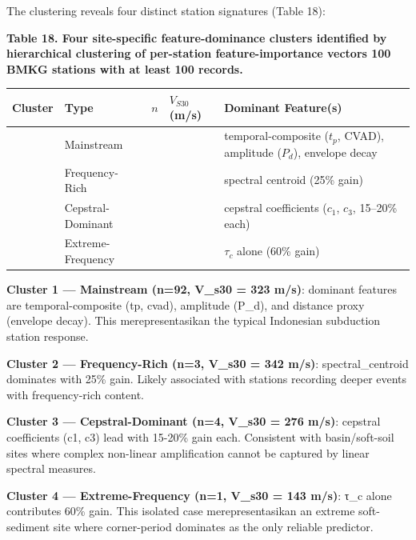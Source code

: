 \documentclass[10pt]{article}
\begin{document}
The clustering reveals four distinct station signatures (Table 18):

\par\vspace{16pt}\noindent\begingroup\centering\fontsize{8}{10}\selectfont\textbf{Table 18. Four site-specific feature-dominance clusters identified by hierarchical clustering of per-station feature-importance vectors 100 BMKG stations with at least 100 records.}\par\endgroup\vspace{6pt}

\begin{longtable}[]{@{}>{\centering\arraybackslash}p{1.5cm}>{\raggedright\arraybackslash}p{2.8cm}>{\centering\arraybackslash}p{1.2cm}>{\centering\arraybackslash}p{1.5cm}>{\raggedright\arraybackslash}p{4.5cm}@{}}
\toprule
Cluster & Type & $n$ & $V_{S30}$ (m/s) & Dominant Feature(s) \\
\midrule
\endhead
\bottomrule
\endlastfoot
1 & Mainstream & 92 & 323 & temporal-composite ($t_p$, CVAD), amplitude ($P_d$), envelope decay \\
2 & Frequency-Rich & 3 & 342 & spectral centroid (25\% gain) \\
3 & Cepstral-Dominant & 4 & 276 & cepstral coefficients ($c_1$, $c_3$, 15--20\% each) \\
4 & Extreme-Frequency & 1 & 143 & $\tau_c$ alone (60\% gain) \\
\end{longtable}

\textbf{Cluster 1 --- Mainstream (n=92, V\_s30 = 323 m/s)}: dominant features are temporal-composite (tp, cvad), amplitude (P\_d), and distance proxy (envelope decay). This merepresentasikan the typical Indonesian subduction station response.

\textbf{Cluster 2 --- Frequency-Rich (n=3, V\_s30 = 342 m/s)}: spectral\_centroid dominates with 25\% gain. Likely associated with stations recording deeper events with frequency-rich content.

\textbf{Cluster 3 --- Cepstral-Dominant (n=4, V\_s30 = 276 m/s)}: cepstral coefficients (c1, c3) lead with 15-20\% gain each. Consistent with basin/soft-soil sites where complex non-linear amplification cannot be captured by linear spectral measures.

\textbf{Cluster 4 --- Extreme-Frequency (n=1, V\_s30 = 143 m/s)}: τ\_c alone contributes 60\% gain. This isolated case merepresentasikan an extreme soft-sediment site where corner-period dominates as the only reliable predictor.
\end{document}
